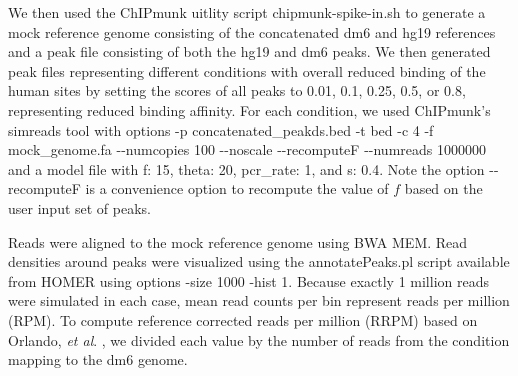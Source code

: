 \documentclass[12pt]{article}
\begin{document}
We then used the ChIPmunk uitlity script chipmunk-spike-in.sh to generate a mock reference genome consisting of the concatenated dm6 and hg19 references and a peak file consisting of both the hg19 and dm6 peaks. We then generated peak files representing different conditions with overall reduced binding of the human sites by setting the scores of all peaks to 0.01, 0.1, 0.25, 0.5, or 0.8, representing reduced binding affinity.
For each condition, we used ChIPmunk's simreads tool with options -p concatenated\_peakds.bed -t bed -c 4 -f mock\_genome.fa -{}-numcopies 100 -{}-noscale -{}-recomputeF -{}-numreads 1000000 and a model file with f: 15, theta: 20, pcr\_rate: 1, and s: 0.4. Note the option -{}-recomputeF is a convenience option to recompute the value of $f$ based on the user input set of peaks.

Reads were aligned to the mock reference genome using BWA MEM. Read densities around peaks were visualized using the annotatePeaks.pl script available from HOMER \cite{HOMER} using options -size 1000 -hist 1.
Because exactly 1 million reads were simulated in each case, mean read counts per bin represent reads per million (RPM).
To compute reference corrected reads per million (RRPM) based on Orlando, \emph{et al}. \cite{spikein}, we divided each value by the number of reads from the condition mapping to the dm6 genome.



\end{document}
